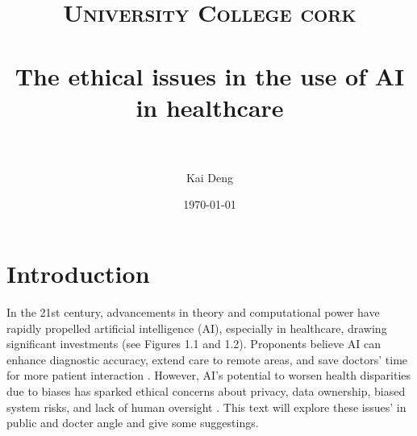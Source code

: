 \documentclass[paper=a4, fontsize=11pt]{scrartcl} %
\title{	
\normalfont \normalsize 
\textsc{University College cork} \\ [25pt] %
\horrule{0.5pt} \\[0.4cm] %
\huge The ethical issues in the use of AI in healthcare \\ %
\horrule{2pt} \\[0.5cm] %
}
\author{Kai Deng} %
\date{\normalsize\today} %
\numberwithin{equation}{section} %
\numberwithin{figure}{section} %
\numberwithin{table}{section} %
\begin{document}
\maketitle %


\section{Introduction}

In the 21st century, advancements in theory and computational power have rapidly propelled 
artificial intelligence (AI), especially in healthcare, drawing significant investments (see Figures 1.1 and 1.2). 
Proponents believe AI can enhance diagnostic accuracy, extend care to remote areas, and save doctors' 
time for more patient interaction \cite{frostPublicViewsEthical2022}. However, AI's potential to worsen 
health disparities due to biases has sparked ethical concerns about privacy, data ownership, biased system risks, 
and lack of human oversight \cite{onianiAdoptingExpandingEthical2023, katiraiEthicsAdvancingArtificial2023}. 
This text will explore these issues' in public and docter angle and give some suggestings.
\end{document}
